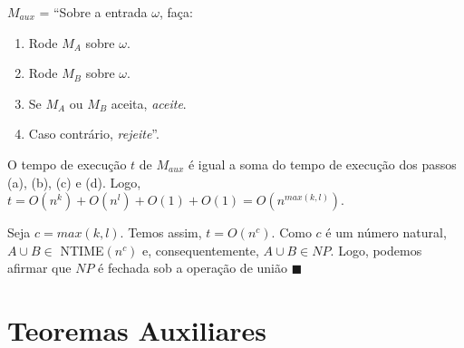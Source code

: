 \documentclass[12pt,a4paper,oneside]{article}
\begin{document}
\begin{enumerate}
{			$M_{aux}$ = ``Sobre a entrada $\omega$, faça:
			\begin{enumerate}
				\item Rode $M_A$ sobre $\omega$.
				\item Rode $M_B$ sobre $\omega$.
				\item Se $M_A$ ou $M_B$ aceita, {\it aceite}.
				\item Caso contrário, {\it rejeite}''.
			\end{enumerate}
			
			O tempo de execução $t$ de $M_{aux}$ é igual a soma do tempo de execução dos passos (a), (b), (c) e (d). Logo, $t = O(n^k) + O(n^l) + O(1) + O(1) = O(n^{max(k,l)})$. 
			
			Seja  $c = max(k,l)$. Temos assim, $t = O(n^c)$. Como $c$ é um número natural, $A \cup B \in$ {\sc NTIME}$(n^c)$ e, consequentemente, $A \cup B \in NP$. Logo, podemos afirmar que $NP$ é fechada sob a operação de união $\blacksquare$
	}
	
\end{enumerate}

\section*{Teoremas Auxiliares}
\end{document}
